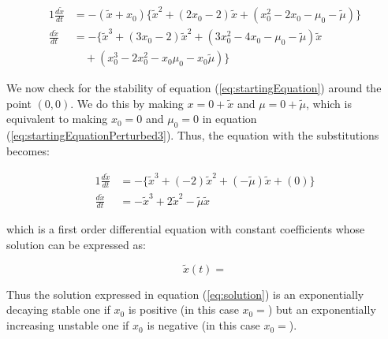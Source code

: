 \documentclass{article}
\begin{document}
	\begin{alignat}{1}
		\label{eq:startingEquationPerturbed3}
		\frac{d\tilde{x}}{dt} &= -(\tilde{x}+x_0)\{\tilde{x}^2 + (2x_0-2)\tilde{x} + (x_0^2-2x_0-\mu_0-\tilde{\mu})\} \nonumber \\		
		\frac{d\tilde{x}}{dt} &= -\{\tilde{x}^3 + (3x_0-2)\tilde{x}^2 + (3x_0^2-4x_0-\mu_0-\tilde{\mu})\tilde{x} \\&{\hspace{12pt}}   +(x_0^3 -2x_0^2 -x_0\mu_0 -x_0\tilde{\mu})\} \nonumber
	\end{alignat}	
	
	We now check for the stability of equation (\ref{eq:startingEquation}) around the point $(0,0)$. We do this by making $x = 0 + \tilde{x}$ and $\mu = 0 + \tilde{\mu}$, which is equivalent to making $x_0 = 0$ and $\mu_0 = 0$ in equation (\ref{eq:startingEquationPerturbed3}). Thus, the equation with the substitutions becomes:
	
	\begin{alignat}{1}
		\frac{d\tilde x}{dt} &= -\{\tilde{x}^3 + (-2)\tilde{x}^2 + (-\tilde{\mu})\tilde{x} +(0)\} \nonumber \\
		 \frac{d\tilde x}{dt} &= -\tilde{x}^3 + 2\tilde{x}^2 -\tilde{\mu}\tilde{x}
	\end{alignat}
	
	which is a first order differential equation with constant coefficients whose solution can be expressed as:
	
	\begin{equation}
		\label{eq:solution}
		\tilde{x}(t) = 
	\end{equation}
	
	Thus the solution expressed in equation (\ref{eq:solution}) is an exponentially decaying stable one if $x_0$ is positive (in this case $x_0 = $) but an exponentially increasing unstable one if $x_0$ is negative (in this case $x_0 = $).
\end{document}
